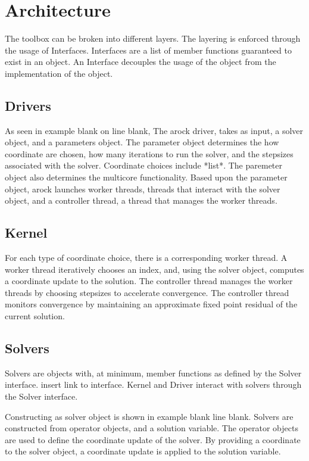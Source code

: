 \section{Architecture}

The toolbox can be broken into different layers. 
The layering is enforced through the usage of Interfaces.
Interfaces are a list of member functions guaranteed to exist in an object.
An Interface decouples the usage of the object from the implementation of the object. 

\subsection{Drivers}

As seen in example blank on line blank, The  arock driver, takes as input, a solver object, and a parameters object.
The parameter object determines the how coordinate are chosen, how many iterations to run the solver, and the stepsizes associated with the solver.
Coordinate choices include *list*.
The paremeter object also determines the multicore functionality. 
Based upon the parameter object, arock launches worker threads, threads that interact with the solver object, and a controller thread, a thread that manages the worker threads.
  

\subsection{Kernel}

For each type of coordinate choice, there is a corresponding worker thread.
A worker thread iteratively chooses an index, and, using the solver object, computes a coordinate update to the solution.
The controller thread manages the worker threads by choosing stepsizes to accelerate convergence.
The controller thread monitors convergence by maintaining an approximate fixed point residual of the current solution.

\subsection{Solvers}

Solvers are objects with, at minimum, member functions as defined by the Solver interface.
insert link to interface.
Kernel and Driver interact with solvers through the Solver interface.

Constructing as solver object is shown in example blank line blank.
Solvers are constructed from operator objects, and a solution variable.
The operator objects are used to define the coordinate update of the solver.
By providing a coordinate to the solver object, a coordinate update is applied to the solution variable.


